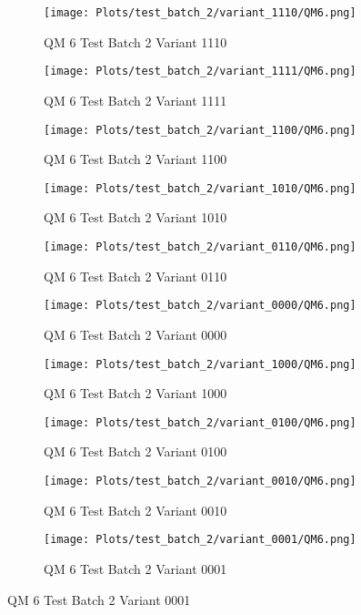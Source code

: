 \documentclass{DissertateFigs}
\begin{document}
\begin{figure}[t!]
    \begin{subfigure}{0.47\textwidth}
    \texttt{[image: Plots/test\_batch\_2/variant\_1110/QM6.png]}
    \caption{QM 6 Test Batch 2 Variant 1110}
    \end{subfigure}
    \begin{subfigure}{0.47\textwidth}
    \texttt{[image: Plots/test\_batch\_2/variant\_1111/QM6.png]}
    \caption{QM 6 Test Batch 2 Variant 1111}
    \end{subfigure}

\medskip

    \begin{subfigure}{0.47\textwidth}
    \texttt{[image: Plots/test\_batch\_2/variant\_1100/QM6.png]}
    \caption{QM 6 Test Batch 2 Variant 1100}
    \end{subfigure}
    \begin{subfigure}{0.47\textwidth}
    \texttt{[image: Plots/test\_batch\_2/variant\_1010/QM6.png]}
    \caption{QM 6 Test Batch 2 Variant 1010}
    \end{subfigure}

\medskip

    \begin{subfigure}{0.47\textwidth}
    \texttt{[image: Plots/test\_batch\_2/variant\_0110/QM6.png]}
    \caption{QM 6 Test Batch 2 Variant 0110}
    \end{subfigure}
    \begin{subfigure}{0.47\textwidth}
    \texttt{[image: Plots/test\_batch\_2/variant\_0000/QM6.png]}
    \caption{QM 6 Test Batch 2 Variant 0000}
    \end{subfigure}

\medskip

    \begin{subfigure}{0.47\textwidth}
    \texttt{[image: Plots/test\_batch\_2/variant\_1000/QM6.png]}
    \caption{QM 6 Test Batch 2 Variant 1000}
    \end{subfigure}
    \begin{subfigure}{0.47\textwidth}
    \texttt{[image: Plots/test\_batch\_2/variant\_0100/QM6.png]}
    \caption{QM 6 Test Batch 2 Variant 0100}
    \end{subfigure}

\medskip

    \begin{subfigure}{0.47\textwidth}
    \texttt{[image: Plots/test\_batch\_2/variant\_0010/QM6.png]}
    \caption{QM 6 Test Batch 2 Variant 0010}
    \end{subfigure}
    \begin{subfigure}{0.47\textwidth}
    \texttt{[image: Plots/test\_batch\_2/variant\_0001/QM6.png]}
    \caption{QM 6 Test Batch 2 Variant 0001}
    \end{subfigure}


\end{figure}
\end{document}
